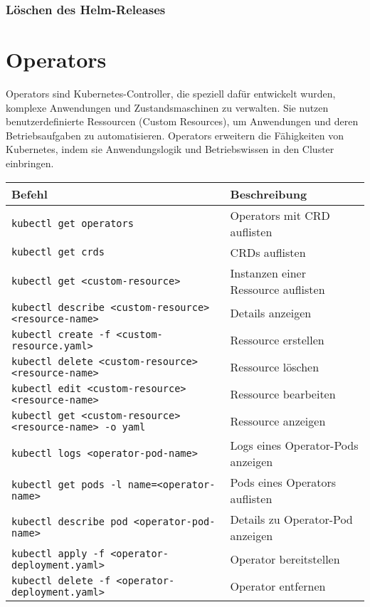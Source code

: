 \subsubsection{Löschen des Helm-Releases}


\newpage

\section{Operators}
Operators sind Kubernetes-Controller, die speziell dafür entwickelt wurden, komplexe Anwendungen und Zustandsmaschinen zu verwalten. Sie nutzen benutzerdefinierte Ressourcen (Custom Resources), um Anwendungen und deren Betriebsaufgaben zu automatisieren. Operators erweitern die Fähigkeiten von Kubernetes, indem sie Anwendungslogik und Betriebswissen in den Cluster einbringen.\\

\noindent
\begin{tabular}{|p{}|p{}|}
\hline
\textbf{Befehl} & \textbf{Beschreibung} \\
\hline
\texttt{kubectl get operators} & Operators mit CRD auflisten \\
\texttt{kubectl get crds} & CRDs auflisten \\
\texttt{kubectl get <custom-resource>} & Instanzen einer Ressource auflisten \\
\texttt{kubectl describe <custom-resource> <resource-name>} & Details anzeigen \\
\texttt{kubectl create -f <custom-resource.yaml>} & Ressource erstellen \\
\texttt{kubectl delete <custom-resource> <resource-name>} & Ressource löschen \\
\texttt{kubectl edit <custom-resource> <resource-name>} & Ressource bearbeiten \\
\texttt{kubectl get <custom-resource> <resource-name> -o yaml} & Ressource anzeigen \\
\texttt{kubectl logs <operator-pod-name>} & Logs eines Operator-Pods anzeigen \\
\texttt{kubectl get pods -l name=<operator-name>} & Pods eines Operators auflisten \\
\texttt{kubectl describe pod <operator-pod-name>} & Details zu Operator-Pod anzeigen \\
\texttt{kubectl apply -f <operator-deployment.yaml>} & Operator bereitstellen \\
\texttt{kubectl delete -f <operator-deployment.yaml>} & Operator entfernen \\
\hline
\end{tabular}

